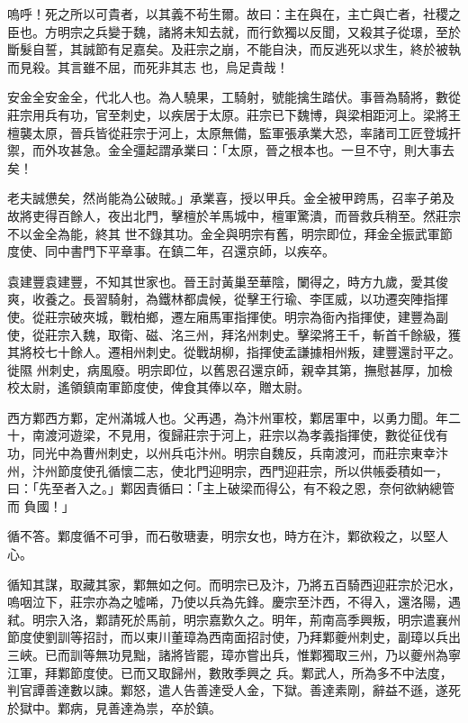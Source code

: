 \begin{pinyinscope}
 嗚呼！死之所以可貴者，以其義不茍生爾。故曰：主在與在，主亡與亡者，社稷之臣也。方明宗之兵變于魏，諸將未知去就，而行欽獨以反聞，又殺其子從璟，至於斷髮自誓，其誠節有足嘉矣。及莊宗之崩，不能自決，而反逃死以求生，終於被執而見殺。其言雖不屈，而死非其志
 也，烏足貴哉！



 安金全安金全，代北人也。為人驍果，工騎射，號能擒生踏伏。事晉為騎將，數從莊宗用兵有功，官至刺史，以疾居于太原。莊宗已下魏博，與梁相距河上。梁將王檀襲太原，晉兵皆從莊宗于河上，太原無備，監軍張承業大恐，率諸司工匠登城扞禦，而外攻甚急。金全彊起謂承業曰：「太原，晉之根本也。一旦不守，則大事去矣！



 老夫誠憊矣，然尚能為公破賊。」承業喜，授以甲兵。金全被甲跨馬，召率子弟及故將吏得百餘人，夜出北門，擊檀於羊馬城中，檀軍驚潰，而晉救兵稍至。然莊宗不以金全為能，終其
 世不錄其功。金全與明宗有舊，明宗即位，拜金全振武軍節度使、同中書門下平章事。在鎮二年，召還京師，以疾卒。



 袁建豐袁建豐，不知其世家也。晉王討黃巢至華陰，闌得之，時方九歲，愛其俊爽，收養之。長習騎射，為鐵林都虞候，從擊王行瑜、李匡威，以功遷突陣指揮使。從莊宗破夾城，戰柏鄉，遷左廂馬軍指揮使。明宗為衙內指揮使，建豐為副使，從莊宗入魏，取衛、磁、洺三州，拜洺州刺史。擊梁將王千，斬首千餘級，獲其將校七十餘人。遷相州刺史。從戰胡柳，指揮使孟謙據相州叛，建豐還討平之。徙隰
 州刺史，病風廢。明宗即位，以舊恩召還京師，親幸其第，撫慰甚厚，加檢校太尉，遙領鎮南軍節度使，俾食其俸以卒，贈太尉。



 西方鄴西方鄴，定州滿城人也。父再遇，為汴州軍校，鄴居軍中，以勇力聞。年二十，南渡河遊梁，不見用，復歸莊宗于河上，莊宗以為孝義指揮使，數從征伐有功，同光中為曹州刺史，以州兵屯汴州。明宗自魏反，兵南渡河，而莊宗東幸汴州，汴州節度使孔循懷二志，使北門迎明宗，西門迎莊宗，所以供帳委積如一，曰：「先至者入之。」鄴因責循曰：「主上破梁而得公，有不殺之恩，奈何欲納總管而
 負國！」



 循不答。鄴度循不可爭，而石敬瑭妻，明宗女也，時方在汴，鄴欲殺之，以堅人心。



 循知其謀，取藏其家，鄴無如之何。而明宗已及汴，乃將五百騎西迎莊宗於汜水，嗚咽泣下，莊宗亦為之噓唏，乃使以兵為先鋒。慶宗至汴西，不得入，還洛陽，遇弒。明宗入洛，鄴請死於馬前，明宗嘉歎久之。明年，荊南高季興叛，明宗遣襄州節度使劉訓等招討，而以東川董璋為西南面招討使，乃拜鄴夔州刺史，副璋以兵出三峽。已而訓等無功見黜，諸將皆罷，璋亦嘗出兵，惟鄴獨取三州，乃以夔州為寧江軍，拜鄴節度使。已而又取歸州，數敗季興之
 兵。鄴武人，所為多不中法度，判官譚善達數以諫。鄴怒，遣人告善達受人金，下獄。善達素剛，辭益不遜，遂死於獄中。鄴病，見善達為祟，卒於鎮。



\end{pinyinscope}